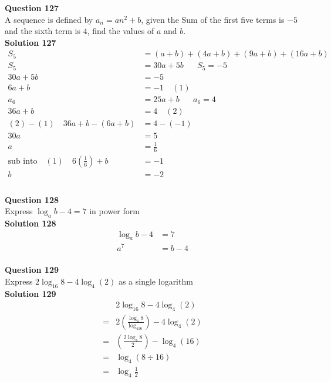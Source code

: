 \documentclass{article}
\begin{document}
\noindent\textbf{Question 127}\\[5pt]
A sequence is defined by $a_n=an^2+b$, given the Sum of the first five terms is $-5$ and the sixth term is $4$, find the values of $a$ and $b$.\\[5pt]
\noindent\textbf{Solution 127}\\[5pt]
\begin{align*}
S_5&=(a+b)+(4a+b)+(9a+b)+(16a+b)\\[2pt]
S_5&=30a+5b\hspace{20pt} S_5=-5\\[2pt]
30a+5b&=-5\\[2pt]
6a+b&=-1\quad (1)\\[12pt]
a_6&=25a+b\hspace{20pt}a_6=4\\[2pt]
36a+b&=4\quad (2)\\[12pt]
(2)-(1)\quad 36a+b-(6a+b)&=4-(-1)\\[2pt]
30a&=5\\[2pt]
a&=\displaystyle\frac{1}{6}\\[12pt]
\text{sub into}\quad (1) \quad 6\left(\displaystyle\frac{1}{6}\right)+b&=-1\\[2pt]
b&=-2\\[2pt]
\end{align*}\\[10pt]

\noindent\textbf{Question 128}\\[5pt]
Express $\log_{a}b-4=7$ in power form\\[5pt]
\noindent\textbf{Solution 128}\\[5pt]
\begin{align*}
\log_{a}b-4&=7\\[2pt]
a^7&=b-4
\end{align*}\\[10pt]

\noindent\textbf{Question 129}\\[5pt]
Express $2\log_{16}8-4\log_{4}(2)$ as a single logarithm\\[5pt]
\noindent\textbf{Solution 129}\\[5pt]
\begin{align*}
&2\log_{16}8-4\log_{4}(2)\\[2pt]
=&2\left(\displaystyle\frac{\log_{4}8}{\log_416}\right)-4\log_{4}(2)\\[2pt]
=&\left(\displaystyle\frac{2\log_{4}8}{2}\right)-\log_{4}(16)\\[2pt]
=&\log_{4}(8 \div 16)\\[2pt]
=&\log_{4}\displaystyle\frac{1}{2}
\end{align*}\\[10pt]
\end{document}

